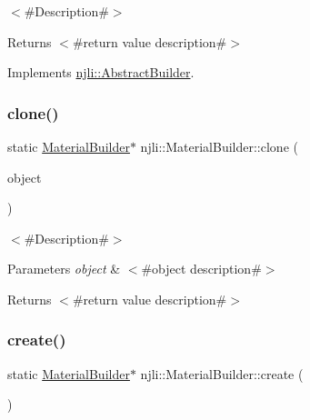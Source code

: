 $<$\#\+Description\#$>$

\begin{DoxyReturn}{Returns}
$<$\#return value description\#$>$ 
\end{DoxyReturn}


Implements \mbox{\hyperlink{classnjli_1_1_abstract_builder_aa1d220053e182c37b31b427499c6eacf}{njli\+::\+Abstract\+Builder}}.

\mbox{\label{classnjli_1_1_material_builder_a2748f334d7e74cfd8b17e404822379b1}} 
\subsubsection{\texorpdfstring{clone()}{clone()}}
{\footnotesize\ttfamily static \mbox{\hyperlink{classnjli_1_1_material_builder}{Material\+Builder}}$\ast$ njli\+::\+Material\+Builder\+::clone (\begin{DoxyParamCaption}\item[{const \mbox{\hyperlink{classnjli_1_1_material_builder}{Material\+Builder}} \&}]{object }\end{DoxyParamCaption})\hspace{0.3cm}{\ttfamily [static]}}

$<$\#\+Description\#$>$


\begin{DoxyParams}{Parameters}
{\em object} & $<$\#object description\#$>$\\
\hline
\end{DoxyParams}
\begin{DoxyReturn}{Returns}
$<$\#return value description\#$>$ 
\end{DoxyReturn}
\mbox{\label{classnjli_1_1_material_builder_a03cf7866e76691ce27d44fde730bf59a}} 
\subsubsection{\texorpdfstring{create()}{create()}}
{\footnotesize\ttfamily static \mbox{\hyperlink{classnjli_1_1_material_builder}{Material\+Builder}}$\ast$ njli\+::\+Material\+Builder\+::create (\begin{DoxyParamCaption}{ }\end{DoxyParamCaption})\hspace{0.3cm}{\ttfamily [static]}}

